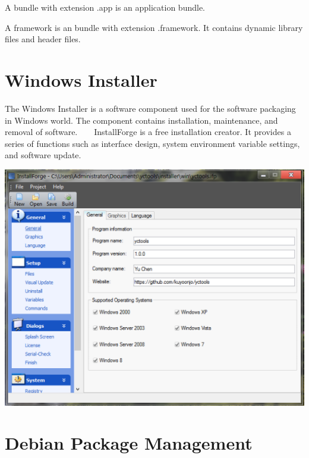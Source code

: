 \begin{DoxyItemize}
\item A bundle with extension .app is an application bundle.
\item A framework is an bundle with extension .framework. It contains dynamic library files and header files.
\end{DoxyItemize}\hypertarget{_software_packaging_SoftwarePackagingWindowsInstaller}{}\section{Windows Installer}\label{_software_packaging_SoftwarePackagingWindowsInstaller}
The Windows Installer is a software component used for the software packaging in Windows world. The component contains installation, maintenance, and removal of software. ~\newline
~\newline
Install\+Forge is a free installation creator. It provides a series of functions such as interface design, system environment variable settings, and software update. \cite{installforge} 
\begin{DoxyImageNoCaption}
  \mbox{\includegraphics[width=\textwidth,height=\textheight/2,keepaspectratio=true]{ResearchInstallForge.png}}
\end{DoxyImageNoCaption}
\hypertarget{_software_packaging_SoftwarePackagingDebianPackageManagement}{}\section{Debian Package Management}\label{_software_packaging_SoftwarePackagingDebianPackageManagement}
